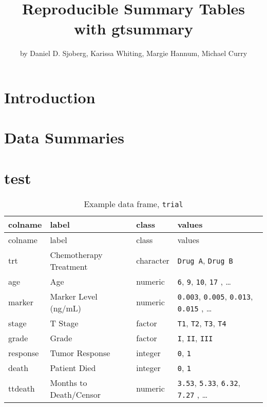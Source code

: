 \title{Reproducible Summary Tables with gtsummary}
\author{by Daniel D. Sjoberg, Karissa Whiting, Margie Hannum, Michael Curry}

\maketitle


\hypertarget{introduction}{%
\section{Introduction}\label{introduction}}

\hypertarget{data-summaries}{%
\section{Data Summaries}\label{data-summaries}}



\section{test}

\begin{longtable}[]{@{}llll@{}}
\caption{Example data frame, \texttt{trial}}\tabularnewline
\toprule
colname & label & class & values\tabularnewline
\midrule
\endfirsthead
\toprule
colname & label & class & values\tabularnewline
\midrule
\endhead
trt & Chemotherapy Treatment & character & \texttt{Drug\ A},
\texttt{Drug\ B}\tabularnewline
age & Age & numeric & \texttt{6}, \texttt{9}, \texttt{10}, \texttt{17} ,
\ldots{}\tabularnewline
marker & Marker Level (ng/mL) & numeric & \texttt{0.003},
\texttt{0.005}, \texttt{0.013}, \texttt{0.015} , \ldots{}\tabularnewline
stage & T Stage & factor & \texttt{T1}, \texttt{T2}, \texttt{T3},
\texttt{T4}\tabularnewline
grade & Grade & factor & \texttt{I}, \texttt{II},
\texttt{III}\tabularnewline
response & Tumor Response & integer & \texttt{0},
\texttt{1}\tabularnewline
death & Patient Died & integer & \texttt{0}, \texttt{1}\tabularnewline
ttdeath & Months to Death/Censor & numeric & \texttt{3.53},
\texttt{5.33}, \texttt{6.32}, \texttt{7.27} , \ldots{}\tabularnewline
\bottomrule
\end{longtable}



\address{Author One\\
  Affiliation\\
  Address\\
  Country\\
  (ORCiD if desired)\\
  }

\address{Author Two\\
  Affiliation\\
  Address\\
  Country\\
  (ORCiD if desired)\\
  }

\address{Author Three\\
  Affiliation\\
  Address\\
  Country\\
  (ORCiD if desired)\\
  }
